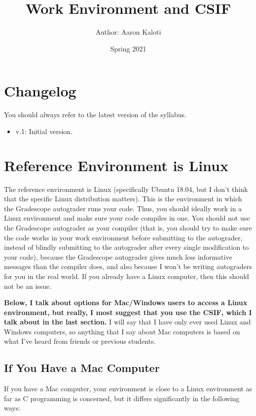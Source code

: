 \documentclass{article}
\title{Work Environment and CSIF}
\author{Author: Aaron Kaloti}
\date{Spring 2021\blfootnote{This content is protected and may not be shared, uploaded, or distributed.}}
\begin{document}
\maketitle

\tableofcontents

\section{Changelog}

You should always refer to the latest version of the syllabus.

\begin{itemize}[itemsep=0mm, parsep=0pt]
\item v.1: Initial version.
\end{itemize}

\section{Reference Environment is Linux}

The reference environment is Linux (specifically Ubuntu 18.04, but I don't think that the specific Linux distribution matters). This is the environment in which the Gradescope autograder runs your code. Thus, you should ideally work in a Linux environment and make sure your code compiles in one. You should not use the Gradescope autograder as your compiler (that is, you should try to make sure the code works in your work environment before submitting to the autograder, instead of blindly submitting to the autograder after every single modification to your code), because the Gradescope autograder gives much less informative messages than the compiler does, and also because I won't be writing autograders for you in the real world. If you already have a Linux computer, then this should not be an issue.

\textbf{Below, I talk about options for Mac/Windows users to access a Linux environment, but really, I most suggest that you use the CSIF, which I talk about in the last section.} I will say that I have only ever used Linux and Windows computers, so anything that I say about Mac computers is based on what I've heard from friends or previous students.

\subsection{If You Have a Mac Computer}

If you have a Mac computer, your environment is close to a Linux environment as far as C programming is concerned, but it differs significantly in the following ways:
\end{document}
